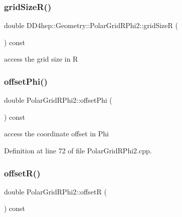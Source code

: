 \subsubsection{\texorpdfstring{grid\+Size\+R()}{gridSizeR()}}
{\footnotesize\ttfamily double D\+D4hep\+::\+Geometry\+::\+Polar\+Grid\+R\+Phi2\+::grid\+SizeR (\begin{DoxyParamCaption}{ }\end{DoxyParamCaption}) const}



access the grid size in R 

\hypertarget{class_d_d4hep_1_1_geometry_1_1_polar_grid_r_phi2_ad52c14c502e272ff92d5250b4cb4169e}{}\label{class_d_d4hep_1_1_geometry_1_1_polar_grid_r_phi2_ad52c14c502e272ff92d5250b4cb4169e} 
\subsubsection{\texorpdfstring{offset\+Phi()}{offsetPhi()}}
{\footnotesize\ttfamily double Polar\+Grid\+R\+Phi2\+::offset\+Phi (\begin{DoxyParamCaption}{ }\end{DoxyParamCaption}) const}



access the coordinate offset in Phi 



Definition at line 72 of file Polar\+Grid\+R\+Phi2.\+cpp.

\hypertarget{class_d_d4hep_1_1_geometry_1_1_polar_grid_r_phi2_afba2de1b5adf2dc1f595eb44420f8a28}{}\label{class_d_d4hep_1_1_geometry_1_1_polar_grid_r_phi2_afba2de1b5adf2dc1f595eb44420f8a28} 
\subsubsection{\texorpdfstring{offset\+R()}{offsetR()}}
{\footnotesize\ttfamily double Polar\+Grid\+R\+Phi2\+::offsetR (\begin{DoxyParamCaption}{ }\end{DoxyParamCaption}) const}



